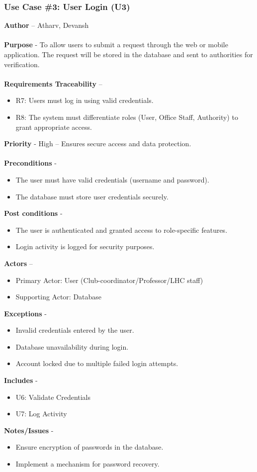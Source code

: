 \documentclass[a4paper,12pt]{article}
\begin{document}
 \subsubsection{Use Case \#3: User Login (U3)}
\textbf{Author} – Atharv, Devansh \\\\
\textbf{Purpose} - To allow users to submit a request through the web or mobile application. The request will be stored in the database and sent to authorities for verification. \\\\
\textbf{Requirements Traceability} – 
\begin{itemize} 
    \item R7: Users must log in using valid credentials.
    \item R8: The system must differentiate roles (User, Office Staff, Authority) to grant appropriate access.
\end{itemize}
\textbf{Priority} - High – Ensures secure access and data protection. \\\\
\textbf{Preconditions} - 
\begin{itemize} 
    \item The user must have valid credentials (username and password).
    \item The database must store user credentials securely.
\end{itemize}
\textbf{Post conditions} - 
\begin{itemize} 
    \item The user is authenticated and granted access to role-specific features.
    \item Login activity is logged for security purposes.
\end{itemize}
\textbf{Actors} – 
\begin{itemize} 
    \item Primary Actor: User (Club-coordinator/Professor/LHC staff)
    \item Supporting Actor: Database
\end{itemize}
\textbf{Exceptions} - 
\begin{itemize} 
    \item Invalid credentials entered by the user.
    \item Database unavailability during login.
    \item Account locked due to multiple failed login attempts.
\end{itemize}
\textbf{Includes} - 
\begin{itemize} 
    \item U6: Validate Credentials
    \item U7: Log Activity
\end{itemize}
\textbf{Notes/Issues} - 
\begin{itemize} 
    \item Ensure encryption of passwords in the database.
    \item Implement a mechanism for password recovery.
\end{itemize}
\newpage
\end{document}
